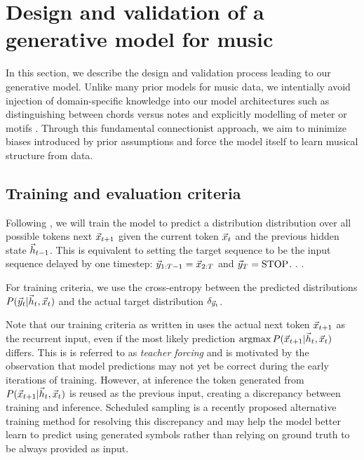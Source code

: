 \section{Design and validation of a generative model for music}

In this section, we describe the design and validation process leading to our
generative model. Unlike many prior models for music data, we intentially avoid
injection of domain-specific knowledge into our model architectures such as
distinguishing between chords versus notes
\citep{hild1991harmonet}\citep{mozer1994neural} \citep{Eck2002} and explicitly
modelling of meter \citep{eck2008learning} or motifs
\citep{feulner1994melonet}. Through this fundamental connectionist approach, we
aim to minimize biases introduced by prior assumptions and force the model
itself to learn musical structure from data.

\subsection{Training and evaluation criteria}

Following \citep{mozer1994neural}, we will train the model to predict a distribution
distribution over all possible tokens next $\vec{x}_{t+1}$ given the current token
$\vec{x}_{t}$ and the previous hidden state $\vec{h}_{t-1}$. This is equivalent to
setting the target sequence to be the input sequence delayed by one timestep:
$\vec{y}_{1:T-1} = \vec{x}_{2:T}$ and $\vec{y}_T = \text{STOP}$. .
.

For training criteria, we use the cross-entropy between the predicted
distributions $P(\vec{y}_t | \vec{h}_t, \vec{x}_t)$ and the actual target distribution
$\delta_{\vec{y}_t}$.

Note that our training criteria as written in  uses the actual
next token $\vec{x}_{t+1}$ as the recurrent input, even if the most likely
prediction $\operatorname*{argmax} P(\vec{x}_{t+1} | \vec{h}_t, \vec{x}_t)$ differs. This is is referred to
as \emph{teacher forcing}\citep{williams1989learning} and is motivated by the
observation that model predictions may not yet be correct during the early
iterations of training. However, at inference the token generated from
$P(\vec{x}_{t+1} | \vec{h}_t, \vec{x}_t)$ is reused as the previous input, creating a
discrepancy between training and inference. Scheduled sampling
\citep{bengio2015scheduled} is a recently proposed alternative training method
for resolving this discrepancy and may help the model better learn to predict
using generated symbols rather than relying on ground truth to be always
provided as input.

